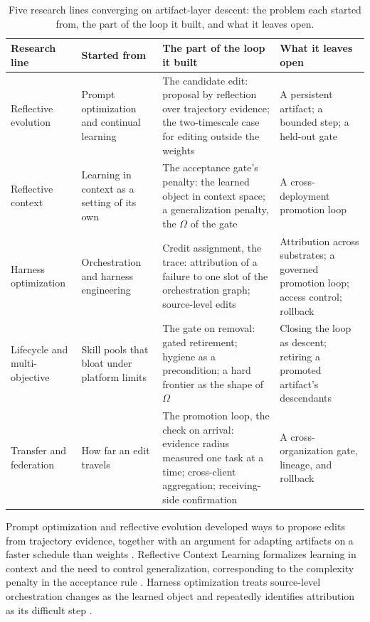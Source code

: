 \begin{table}[h]
\centering\small
\begin{tabular}{>{\raggedright\arraybackslash}p{}>{\raggedright\arraybackslash}p{}>{\raggedright\arraybackslash}p{}>{\raggedright\arraybackslash}p{}}
\toprule
Research line & Started from & The part of the loop it built & What it leaves open \\
\midrule
Reflective evolution & Prompt optimization and continual learning & The candidate edit: proposal by reflection over trajectory evidence; the two-timescale case for editing outside the weights & A persistent artifact; a bounded step; a held-out gate \\
Reflective context & Learning in context as a setting of its own & The acceptance gate's penalty: the learned object in context space; a generalization penalty, the $\Omega$ of the gate & A cross-deployment promotion loop \\
Harness optimization & Orchestration and harness engineering & Credit assignment, the trace: attribution of a failure to one slot of the orchestration graph; source-level edits & Attribution across substrates; a governed promotion loop; access control; rollback \\
Lifecycle and multi-objective & Skill pools that bloat under platform limits & The gate on removal: gated retirement; hygiene as a precondition; a hard frontier as the shape of $\Omega$ & Closing the loop as descent; retiring a promoted artifact's descendants \\
Transfer and federation & How far an edit travels & The promotion loop, the check on arrival: evidence radius measured one task at a time; cross-client aggregation; receiving-side confirmation & A cross-organization gate, lineage, and rollback \\
\bottomrule
\end{tabular}
\caption{Five research lines converging on artifact-layer descent: the problem each started from, the part of the loop it built, and what it leaves open.}
\label{tab:lines}
\end{table}

Prompt optimization and reflective evolution developed ways to propose edits from trajectory evidence, together with an argument for adapting artifacts on a faster schedule than weights \citep{agrawal2025gepa, tiwari2026fastandslow}. Reflective Context Learning formalizes learning in context and the need to control generalization, corresponding to the complexity penalty in the acceptance rule \citep{vassilyev2026rcl}. Harness optimization treats source-level orchestration changes as the learned object and repeatedly identifies attribution as its difficult step \citep{lee2026metaharness, lin2026ahe, cai2026moss, zehle2026cantante, nguyen2026harnessevo, chen2026harnessforge, li2026growingharness}.

